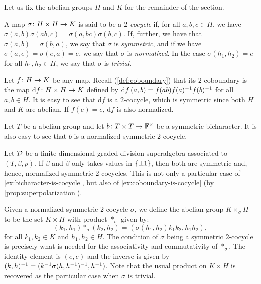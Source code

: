 Let us fix the abelian groups $H$ and $K$ for the remainder of the section.

\begin{defi}
	A map $\sigma\colon H\times H \to K$ is said to be a \emph{$2$-cocycle} if, for all $a,b,c \in H$, we have $\sigma(a,b) \sigma(ab, c) = \sigma(a, bc) \sigma(b,c)$.
	If, further, we have that $\sigma(a,b) = \sigma(b,a)$, we say that $\sigma$ is \emph{symmetric}, and if we have $\sigma(a, e) = \sigma(e, a) = e$, we say that $\sigma$ is \emph{normalized}.
	In the case $\sigma(h_1, h_2) = e$ for all $h_1, h_2 \in H$, we say that $\sigma$ is \emph{trivial}.
\end{defi}


\begin{ex}\label{ex:coboundary-is-cocycle}
	Let $f\colon H \to K$ be any map. 
	Recall (\cref{def:coboundary}) that its $2$-coboundary is the map $\mathrm{d} f\colon H\times H \to K$ defined by $\mathrm{d} f\, (a,b) = f(ab)f(a)^{-1} f(b)^{-1}$ for all $a,b \in H$. 
	It is easy to see that $\mathrm{d} f$ is a $2$-cocycle, which is symmetric since both $H$ and $K$ are abelian. 
	If $f(e) = e$, $\mathrm{d} f$ is also normalized. 
\end{ex}

\begin{ex}\label{ex:bicharacter-is-cocycle}
    Let $T$ be a abelian group and let $b\colon T\times T \to \mathbb{F}^\times$ be a symmetric bicharacter. 
    It is also easy to see that $b$ is a normalized symmetric $2$-cocycle. 
\end{ex}

\begin{ex}\label{ex:beta-is-cocycle}
    Let $\mathcal{D}$ be a finite dimensional graded-division superalgebra associated to $(T, \beta, p)$. 
    If $\beta$ and $\tilde\beta$ only takes values in $\{ \pm 1 \}$, then both are symmetric and, hence, normalized symmetric $2$-cocycles. 
    This is not only a particular case of \cref{ex:bicharacter-is-cocycle}, but also of \cref{ex:coboundary-is-cocycle} (by \cref{prop:superpolarization}). 
\end{ex}


Given a normalized symmetric $2$-cocycle $\sigma$, we define the abelian group $K \times_\sigma H$ to be the set $K\times H$ with product $*_\sigma$ given by:
\[
	(k_1, h_1)*_\sigma(k_2, h_2) = (\sigma(h_1, h_2) k_1 k_2, h_1 h_2),
\]
for all $k_1, k_2 \in K$ and $h_1, h_2 \in H$.
The condition of $\sigma$ being a symmetric $2$-cocycle is precisely what is needed for the associativity and commutativity of $*_\sigma$.
The identity element is $(e, e)$ and the inverse is given by $(k, h)^{-1} = (k^{-1} \sigma(h,h^{-1})^{-1}, h^{-1})$.
Note that the usual product on $K\times H$ is recovered as the particular case when $\sigma$ is trivial.


